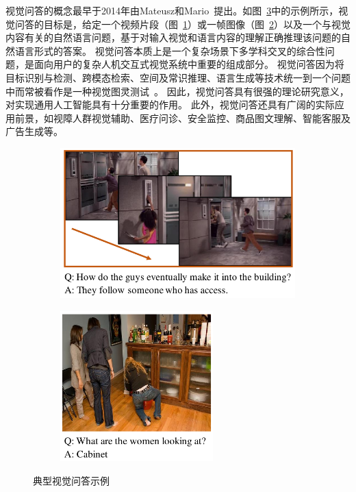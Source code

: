 视觉问答的概念最早于2014年由Mateusz和Mario~\cite{malinowski2014multi}提出。如图~\ref{fig:c1_vqa}中的示例所示，视觉问答的目标是，给定一个视频片段（图~\ref{fig:c1_videoqa_example}）或一帧图像（图~\ref{fig:c1_vqa_example}）以及一个与视觉内容有关的自然语言问题，基于对输入视觉和语言内容的理解正确推理该问题的自然语言形式的答案。
视觉问答本质上是一个复杂场景下多学科交叉的综合性问题，是面向用户的复杂人机交互式视觉系统中重要的组成部分。
视觉问答因为将目标识别与检测、跨模态检索、空间及常识推理、语言生成等技术统一到一个问题中而常被看作是一种视觉图灵测试~\cite{malinowski2014towards}。
因此，视觉问答具有很强的理论研究意义，对实现通用人工智能具有十分重要的作用。
此外，视觉问答还具有广阔的实际应用前景，如视障人群视觉辅助、医疗问诊、安全监控、商品图文理解、智能客服及广告生成等。


\begin{figure}[!t]
\begin{subfigure}[b]{0.59\linewidth}
\centering
\includegraphics[height=5.8cm]{figure/c1_1.pdf}
\label{fig:c1_videoqa_example}
\end{subfigure}
\begin{subfigure}[b]{0.39\linewidth}
\centering
\includegraphics[height=5.8cm]{figure/c1_2.pdf}
\label{fig:c1_vqa_example}
\end{subfigure}
\caption{典型视觉问答示例}
\label{fig:c1_vqa} 
\end{figure}


